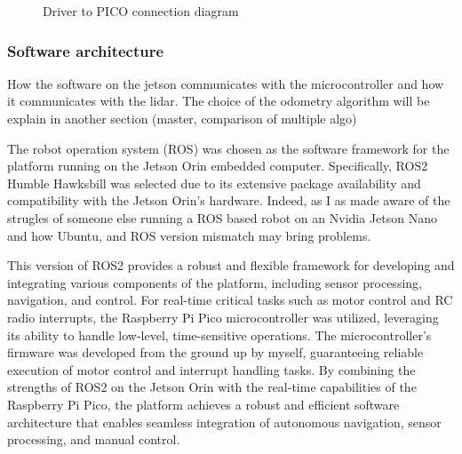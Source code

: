 \documentclass[11pt]{article}
\begin{document}
                
                
                \begin{figure}[h]
                    \centering
                    Driver to PICO connection diagram
                    \label{fig:driver_to_pico}
                \end{figure}

            
            
            \subsubsection{Software architecture}

            How the software on the jetson communicates with the microcontroller and how it communicates with the lidar. The choice of the odometry algorithm will be explain in another section (master, comparison of multiple algo)

            The robot operation system (ROS) was chosen as the software framework for the platform running on the Jetson Orin embedded computer. Specifically, ROS2 Humble Hawksbill was selected due to its extensive package availability and compatibility with the Jetson Orin's hardware. Indeed, as I as made aware of the strugles of someone else running a ROS based robot on an Nvidia Jetson Nano and how Ubuntu, and ROS version mismatch may bring problems. 
            
            This version of ROS2 provides a robust and flexible framework for developing and integrating various components of the platform, including sensor processing, navigation, and control. For real-time critical tasks such as motor control and RC radio interrupts, the Raspberry Pi Pico microcontroller was utilized, leveraging its ability to handle low-level, time-sensitive operations. The microcontroller's firmware was developed from the ground up by myself, guaranteeing reliable execution of motor control and interrupt handling tasks. By combining the strengths of ROS2 on the Jetson Orin with the real-time capabilities of the Raspberry Pi Pico, the platform achieves a robust and efficient software architecture that enables seamless integration of autonomous navigation, sensor processing, and manual control.
\end{document}
